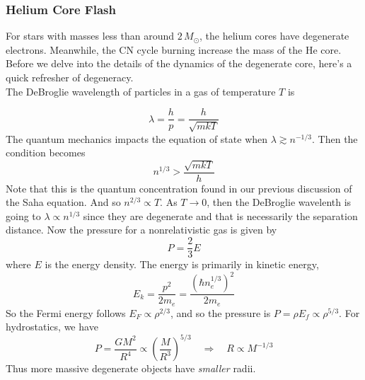 \documentclass[10pt]{article}
\numberwithin{equation}{section}
\newcommand{\n}{\noindent}
\begin{document}
    \subsubsection{Helium Core Flash}
    \label{sec:helium-core-flash}

    For stars with masses less than around $2\,M_\odot$, the helium
    cores have degenerate electrons. Meanwhile, the CN cycle burning
    increase the mass of the He core. Before we delve into the details
    of the dynamics of the degenerate core, here's a quick refresher
    of degeneracy.\\

    \n The DeBroglie wavelength of particles in a gas of temperature
    $T$ is

    \begin{equation}
      \label{eq:277}
      \lambda=\frac{h}{p}=\frac{h}{\sqrt{mkT}}
    \end{equation}
    The quantum mechanics impacts the equation of state when $\lambda
    \gtrsim n^{-1/3}$. Then the condition becomes
    \begin{equation}
      \label{eq:278}
      n^{1/3}>\frac{\sqrt{mkT}}{h}
    \end{equation}
    Note that this is the quantum concentration found in our previous
    discussion of the Saha equation. And so $n^{2/3}\propto T$. As
    $T\to 0$, then the DeBroglie wavelenth is going to $\lambda\propto
    n^{1/3}$ since they are degenerate and that is necessarily the
    separation distance. Now the pressure for a nonrelativistic gas is
    given by
    \begin{equation}
      \label{eq:279}
      P=\frac{2}{3}E
    \end{equation}
    where $E$ is the energy density. The energy is primarily in
    kinetic energy,
    \begin{equation}
      \label{eq:280}
      E_k=\frac{p^2}{2m_e}=\frac{(\hbar n_e^{1/3})^2}{2m_e}
    \end{equation}
    So the Fermi energy follows $E_F\propto \rho^{2/3}$, and so the
    pressure is $P=\rho E_f\propto \rho^{5/3}$. For hydrostatics, we
    have
    \begin{equation}
      \label{eq:281}
      P=\frac{GM^2}{R^4}\propto
      \left(\frac{M}{R^3}\right)^{5/3}\quad\Rightarrow \quad R\propto M^
{-1/3}
    \end{equation} 
    Thus more massive degenerate objects have \emph{smaller}
    radii.\\   
  
\end{document}

